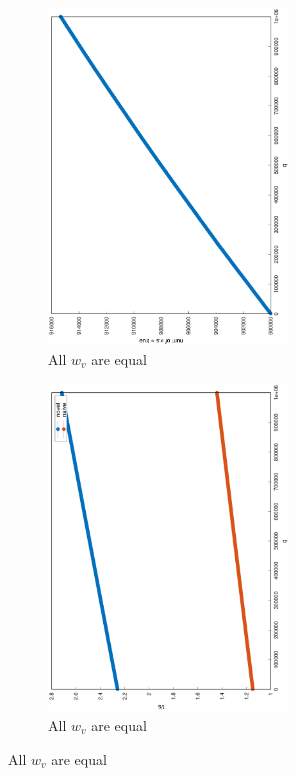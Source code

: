 \documentclass[12pt]{report}
\begin{document}
\begin{figure}
\centering
\begin{subfigure}{0.35\textwidth}
	\includegraphics[width=0.7\textwidth,angle=-90]{graph/uniform_coverage_1000000_10000000_0.1.eps}
	\caption{All $ w_v $ are equal}
\end{subfigure}
\begin{subfigure}{0.35\textwidth}
	\includegraphics[width=0.7\textwidth,angle=-90]{graph/uniform_q_1000000_10000000_0.1.eps}
	\caption{All $ w_v $ are equal}
\end{subfigure}


\end{figure}
\end{document}

